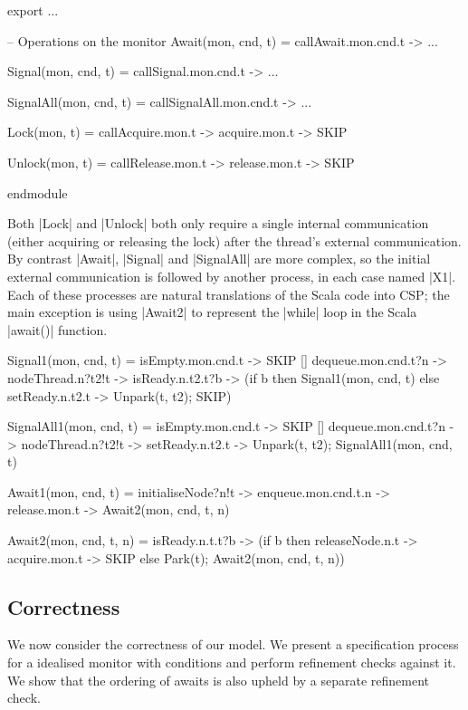 \begin{cspm}
export 
  ...

  -- Operations on the monitor
  Await(mon, cnd, t) = callAwait.mon.cnd.t -> ...

  Signal(mon, cnd, t) = callSignal.mon.cnd.t -> ...

  SignalAll(mon, cnd, t) = callSignalAll.mon.cnd.t -> ...

  Lock(mon, t) = callAcquire.mon.t -> acquire.mon.t -> SKIP

  Unlock(mon, t) = callRelease.mon.t -> release.mon.t -> SKIP

 endmodule
\end{cspm}


Both |Lock| and |Unlock| both only require a single internal communication (either acquiring or releasing the lock) after the thread's external communication. By contrast |Await|, |Signal| and |SignalAll| are more complex, so the initial external communication is followed by another process, in each case named |X1|. Each of these processes are natural translations of the Scala code into CSP; the main exception is using |Await2| to represent the |while| loop in the Scala |await()| function.

\begin{cspm}
  Signal1(mon, cnd, t) = 
       isEmpty.mon.cnd.t -> SKIP
    [] dequeue.mon.cnd.t?n -> nodeThread.n?t2!t -> isReady.n.t2.t?b ->
         (if b then Signal1(mon, cnd, t)
          else setReady.n.t2.t -> Unpark(t, t2); SKIP)

  SignalAll1(mon, cnd, t) =
       isEmpty.mon.cnd.t -> SKIP
    [] dequeue.mon.cnd.t?n -> nodeThread.n?t2!t -> setReady.n.t2.t -> 
            Unpark(t, t2); SignalAll1(mon, cnd, t)

  Await1(mon, cnd, t) = 
    initialiseNode?n!t -> enqueue.mon.cnd.t.n -> release.mon.t -> Await2(mon, cnd, t, n)

  Await2(mon, cnd, t, n) = 
    isReady.n.t.t?b -> (if b then releaseNode.n.t -> acquire.mon.t -> SKIP
                        else Park(t); Await2(mon, cnd, t, n))
\end{cspm}



\subsection{Correctness}

We now consider the correctness of our model. We present a specification process for a idealised monitor with conditions and perform refinement checks against it. We show that the ordering of awaits is also upheld by a separate  refinement check.
  
